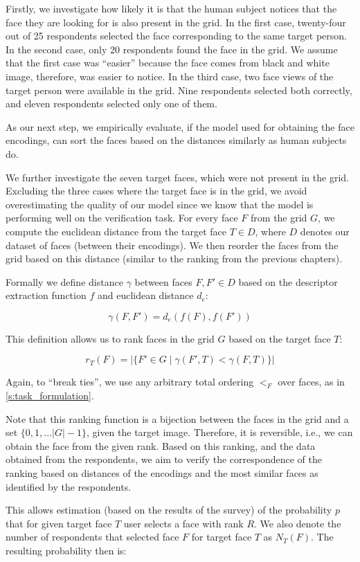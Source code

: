 Firstly, we investigate how likely it is that the human subject notices that the face they are looking for is also present in the grid. In the first case, twenty-four out of 25 respondents selected the face corresponding to the same target person. In the second case, only 20 respondents found the face in the grid. We assume that the first case was ``easier'' because the face comes from black and white image, therefore, was easier to notice. In the third case, two face views of the target person were available in the grid. Nine respondents selected both correctly, and eleven respondents selected only one of them. 

As our next step, we empirically evaluate, if the model used for obtaining the face encodings, can sort the faces based on the distances similarly as human subjects do.

We further investigate the seven target faces, which were not present in the grid. Excluding the three cases where the target face is in the grid, we avoid overestimating the quality of our model since we know that the model is performing well on the verification task. For every face $F$ from the grid $G$, we compute the euclidean distance from the target face $T\in D$, where $D$ denotes our dataset of faces (between their encodings). We then reorder the faces from the grid based on this distance (similar to the ranking from the previous chapters). 

Formally we define distance $\gamma$ between faces $F, F' \in D$ based on the descriptor extraction function $f$ and euclidean distance $d_e$:

$$
\gamma(F, F') = d_e(f(F), f(F'))
$$

This definition allows us to rank faces in the grid $G$ based on the target face $T$:

$$
    r_T(F) = |\{F'\in G\mid\gamma(F', T) < \gamma(F, T)\}|
$$

Again, to ``break ties'', we use any arbitrary total ordering $<_F$ over faces, as in \autoref{s:task_formulation}.

Note that this ranking function is a bijection between the faces in the grid and a set $\{0, 1, \ldots |G| - 1\}$, given the target image. Therefore, it is reversible, i.e., we can obtain the face from the given rank. Based on this ranking, and the data obtained from the respondents, we aim to verify the correspondence of the ranking based on distances of the encodings and the most similar faces as identified by the respondents.

This allows estimation (based on the results of the survey)  of the probability $p$ that for given target face $T$ user selects a face with rank $R$. We also denote the number of respondents that selected face $F$ for target face $T$ as $N_T(F)$. The resulting probability then is:

